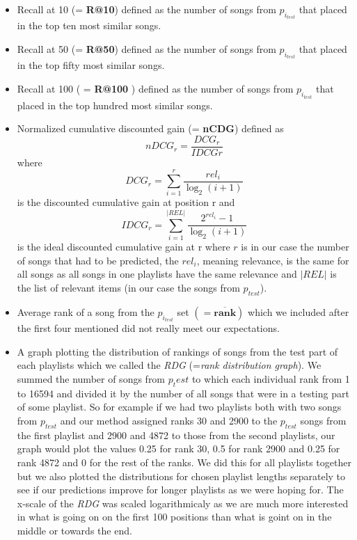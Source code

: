 \begin{itemize}
    \item Recall at 10 (= \textbf{R@10}) defined as the number of songs from $p_{i_{test}} $ that placed in the top ten most similar songs.
    \item Recall at 50 (= \textbf{R@50}) defined as the number of songs from $p_{i_{test}} $ that placed in the top fifty most similar songs.
    \item Recall at 100 ( = \textbf{R@100} ) defined as the number of songs from $p_{i_{test}} $ that placed in the top hundred most similar songs.
    \item Normalized cumulative discounted gain (= \textbf{nCDG}) defined as 
    $${nDCG_{r}} = \frac{DCG_{r}}{IDCG{r}} $$
    where 
    $${DCG_{r}} =\sum_{i=1}^{r}{\frac {rel_{i}}{\log _{2}(i+1)}} $$ 
    is the discounted cumulative gain at position r and 
    $$ {IDCG_{r}} =\sum _{i=1}^{|REL|}{\frac {2^{rel_{i}}-1}{\log _{2}(i+1)}} $$
    is the ideal discounted cumulative gain at r
    where $r$ is in our case the number of songs that had to be predicted, the $rel_i$, meaning relevance, is the same for all songs as all songs in one playlists have the same relevance and $|REL|$ is the list of relevant items (in our case the songs from $p_{test}$).
    \item Average rank of a song from the $p_{i_{test}}$ set $ \boldsymbol{ (= \overline{rank})} $ which we included after the first four mentioned did not really meet our expectations.
    \item A graph plotting the distribution of rankings of songs from the test part of each playlists which we called the \textit{RDG} (=\textit{rank distribution graph}). We summed the number of songs from $p_test$ to which each individual rank from 1 to 16594 and divided it by the number of all songs that were in a testing part of some playlist. So for example if we had two playlists both with two songs from $p_{test}$ and our method assigned ranks 30 and 2900 to the $p_{test}$ songs from the first playlist and 2900 and 4872 to those from the second playlists, our graph would plot the values 0.25 for rank 30, 0.5 for rank 2900 and 0.25 for rank 4872 and 0 for the rest of the ranks. We did this for all playlists together but we also plotted the distributions for chosen playlist lengths separately to see if our predictions improve for longer playlists as we were hoping for. The x-scale of the \textit{RDG} was scaled logarithmicaly as we are much more interested in what is going on on the first 100 positions than what is goint on in the middle or towards the end. \\
\end{itemize}
